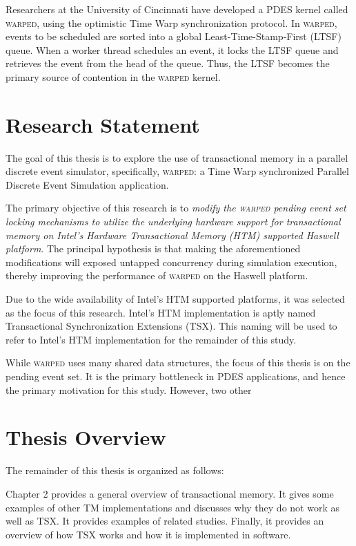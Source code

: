 \documentclass[11pt]{book}
\begin{document}
Researchers at the University of Cincinnati have developed a PDES kernel called \textsc{warped},
using the optimistic Time Warp synchronization protocol.  In \textsc{warped}, events to be
scheduled are sorted into a global Least-Time-Stamp-First (LTSF) queue.  When a worker
thread schedules an event, it locks the LTSF queue and retrieves the event from the head
of the queue.  Thus, the LTSF becomes the primary source of contention in the \textsc{warped}
kernel.

\section{Research Statement}

The goal of this thesis is to explore the use of transactional memory in a parallel
discrete event simulator, specifically, \textsc{warped}: a Time Warp synchronized Parallel Discrete
Event Simulation application.

The primary objective of this research is to \textit{modify the \textsc{warped} pending event set
  locking mechanisms to utilize the underlying hardware support for transactional memory
  on Intel's Hardware Transactional Memory (HTM) supported Haswell platform}.  The
principal hypothesis is that making the aforementioned modifications will exposed untapped
concurrency during simulation execution, thereby improving the performance of \textsc{warped} on
the Haswell platform.

Due to the wide availability of Intel's HTM supported platforms, it was selected as the
focus of this research.  Intel's HTM implementation is aptly named Transactional
Synchronization Extensions (TSX).  This naming will be used to refer to Intel's HTM
implementation for the remainder of this study.

While \textsc{warped} uses many shared data structures, the focus of this thesis is on the pending
event set.  It is the primary bottleneck in PDES applications, and hence the primary
motivation for this study.  However, two other

\section{Thesis Overview}

The remainder of this thesis is organized as follows:

Chapter 2 provides a general overview of transactional memory.  It gives some examples of
other TM implementations and discusses why they do not work as well as TSX.  It provides
examples of related studies.  Finally, it provides an overview of how TSX works and how it
is implemented in software.
\end{document}
